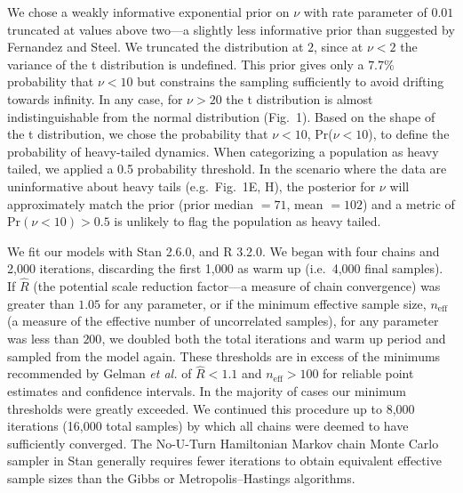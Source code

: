 \documentclass[12pt]{article}
\begin{document}
We chose a weakly informative exponential prior on \(\nu\) with rate parameter of \(0.01\) truncated at values above two---a slightly less informative prior than suggested by Fernandez and Steel\cite{fernandez1998}. We truncated the distribution at \(2\), since at \(\nu < 2\) the variance of the t distribution is undefined. This prior gives only a \(7.7\)\% probability that \(\nu < 10\) but constrains the sampling sufficiently to avoid drifting towards infinity. In any case, for \(\nu > 20\) the t distribution is almost indistinguishable from the normal distribution (Fig.~1). Based on the shape of the t distribution, we chose the probability that \(\nu < 10\), Pr(\(\nu < 10\)), to define the probability of heavy-tailed dynamics. When categorizing a population as heavy tailed, we applied a 0.5 probability threshold. In the scenario where the data are uninformative about heavy tails (e.g.~Fig.~1E, H), the posterior for \(\nu\) will approximately match the prior (prior median \(= 71\), mean \(= 102\)) and a metric of Pr\((\nu < 10) > 0.5\) is unlikely to flag the population as heavy tailed.

We fit our models with Stan 2.6.0\cite{stan-manual2015, hoffman2014}, and R 3.2.0\cite{r2015}. We began with four chains and 2,000 iterations, discarding the first 1,000 as warm up (i.e.~4,000 final samples). If \(\hat{R}\) (the potential scale reduction factor---a measure of chain convergence) was greater than \(1.05\) for any parameter, or if the minimum effective sample size, \(n_\mathrm{eff}\) (a measure of the effective number of uncorrelated samples), for any parameter was less than \(200\), we doubled both the total iterations and warm up period and sampled from the model again. These thresholds are in excess of the minimums recommended by Gelman \emph{et al.}\cite{gelman2006a} of \(\hat{R} < 1.1\) and \(n_\mathrm{eff} > 100\) for reliable point estimates and confidence intervals. In the majority of cases our minimum thresholds were greatly exceeded. We continued this procedure up to 8,000 iterations (16,000 total samples) by which all chains were deemed to have sufficiently converged. The No-U-Turn Hamiltonian Markov chain Monte Carlo sampler in Stan generally requires fewer iterations to obtain equivalent effective sample sizes than the Gibbs or Metropolis--Hastings algorithms\cite{stan-manual2015}.
\end{document}
